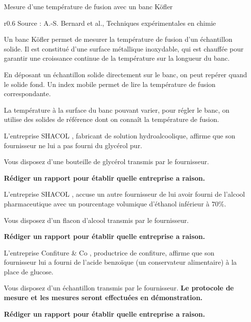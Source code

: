 \begin{doc}{Mesure d'une température de fusion avec un banc Köfler}
  \vspace*{-1.2cm}
  \begin{wrapfigure}[10]{r}{0.6\linewidth}
    \centering
    {\scriptsize Source : A.-S. Bernard et al., Techniques expérimentales en chimie}
  \end{wrapfigure}
  
  Un banc Köfler permet de mesurer la température de fusion d'un échantillon solide.
  Il est constitué d'une surface métallique inoxydable, qui est chauffée pour garantir une croissance continue de la température sur la longueur du banc.
  
  En déposant un échantillon solide directement sur le banc, on peut repérer quand le solide fond.
  Un index mobile permet de lire la température de fusion correspondante.
  
  La température à la surface du banc pouvant varier, pour régler le banc, on utilise des solides de référence dont on connaît la température de fusion.
\end{doc}

\newpage

L'entreprise \og SHACOL \fg, fabricant de solution hydroalcoolique, affirme que son fournisseur ne lui a pas fourni du glycérol pur.

Vous disposez d'une bouteille de glycérol transmis par le fournisseur.

\begin{center}
\textbf{Rédiger un rapport pour établir quelle entreprise a raison.}
\end{center}



L'entreprise \og SHACOL \fg, accuse un autre fournisseur de lui avoir fourni de l'alcool pharmaceutique avec un pourcentage volumique d'éthanol inférieur à $70 \%$.

Vous disposez d'un flacon d'alcool transmis par le fournisseur.

\begin{center}
\textbf{Rédiger un rapport pour établir quelle entreprise a raison.}
\end{center}



L'entreprise \og Confiture \& Co \fg, productrice de confiture, affirme que son fournisseur lui a fourni de l'acide benzoïque (un conservateur alimentaire) à la place de glucose.

Vous disposez d'un échantillon transmis par le fournisseur. \textbf{Le protocole de mesure et les mesures seront effectuées en démonstration.}

\begin{center}
\textbf{Rédiger un rapport pour établir quelle entreprise a raison.}
\end{center}


\feuilleBlanche
